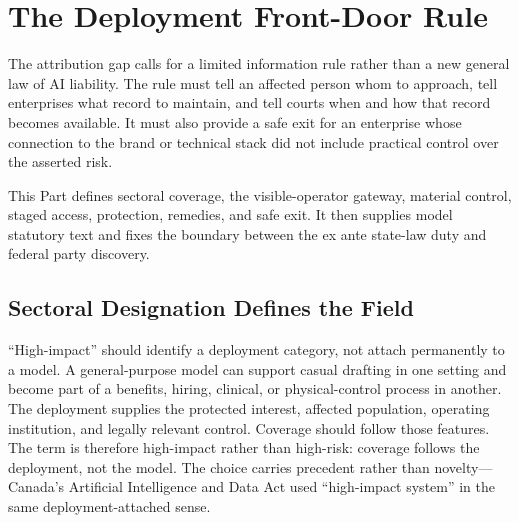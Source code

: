 \section{The Deployment Front-Door Rule}
\label{sec:rule}

The attribution gap calls for a limited information rule rather than a new general law of AI liability. The rule must tell an affected person whom to approach, tell enterprises what record to maintain, and tell courts when and how that record becomes available. It must also provide a safe exit for an enterprise whose connection to the brand or technical stack did not include practical control over the asserted risk.

This Part defines sectoral coverage, the visible-operator gateway, material control, staged access, protection, remedies, and safe exit. It then supplies model statutory text and fixes the boundary between the ex ante state-law duty and federal party discovery.

\subsection{Sectoral Designation Defines the Field}
\label{sec:designation}

``High-impact'' should identify a deployment category, not attach permanently to a model. A general-purpose model can support casual drafting in one setting and become part of a benefits, hiring, clinical, or physical-control process in another. The deployment supplies the protected interest, affected population, operating institution, and legally relevant control. Coverage should follow those features. The term is therefore high-impact rather than high-risk: coverage follows the deployment, not the model. The choice carries precedent rather than novelty---Canada's Artificial Intelligence and Data Act used ``high-impact system'' in the same deployment-attached sense.

